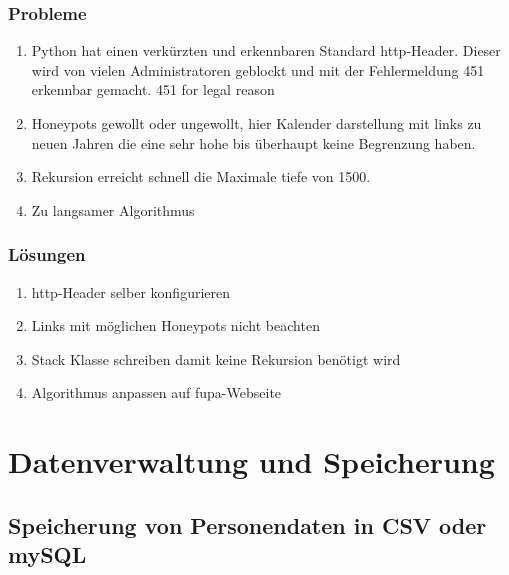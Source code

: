 \subsubsection{Probleme} %
\begin{enumerate}
	\item Python hat einen verkürzten und erkennbaren Standard http-Header. Dieser wird von vielen Administratoren geblockt und mit der Fehlermeldung 451 erkennbar gemacht. 451 for legal reason
	\item Honeypots gewollt oder ungewollt, hier Kalender darstellung mit links zu neuen Jahren die eine sehr hohe bis überhaupt keine Begrenzung haben.
	\item Rekursion erreicht schnell die Maximale tiefe von 1500.
	\item Zu langsamer Algorithmus
\end{enumerate}


\subsubsection{Lösungen}
\begin{enumerate}
	\item http-Header selber konfigurieren
	\item Links mit möglichen Honeypots nicht beachten
	\item Stack Klasse schreiben damit keine Rekursion benötigt wird
	\item Algorithmus anpassen auf fupa-Webseite
\end{enumerate}

\section{Datenverwaltung und Speicherung}
\subsection{Speicherung von Personendaten in CSV oder mySQL}


